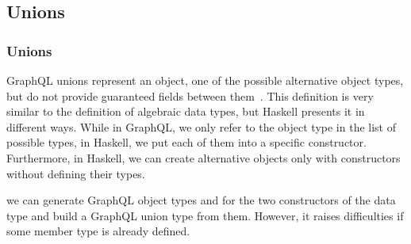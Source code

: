 \subsection{Unions}
\begin{frame}\frametitle{Unions}
GraphQL unions represent an object, one of the possible alternative object types, but do not provide guaranteed fields between them~\cite{gql-spec}.
This definition is very similar to the definition of algebraic data types, but Haskell presents it in different ways. While in GraphQL, we only refer to the object type in the list of possible types, in Haskell, we put each of them into a specific constructor. Furthermore, in Haskell, we can create alternative objects only with constructors without defining their types.

we can generate GraphQL object types  and  for the two constructors of the data type  and build a GraphQL union type from them. However, it raises difficulties if some member type is already defined.







\end{frame}
